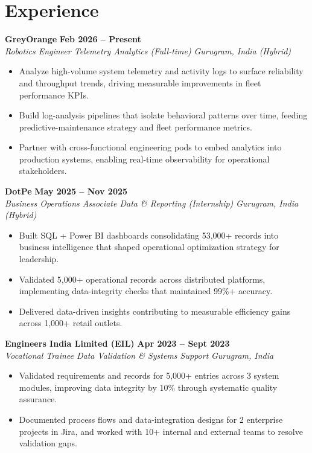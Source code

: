 \documentclass[10pt,a4paper]{article}
\newcommand{\entry}[4]{%
  \textbf{#1} \hfill \textbf{\small #4}\\
  \textit{\small #2} \hfill \textit{\small #3}\par\vspace{0.5pt}%
}
\newcommand{\rbullets}[1]{%
  {\small
  \begin{itemize}[leftmargin=1.1em,itemsep=0.5pt,topsep=1.5pt,parsep=0pt,partopsep=0pt,label=\textbullet]
    #1
  \end{itemize}}%
}
\begin{document}
\section{Experience}

\entry{GreyOrange}{Robotics Engineer \textemdash{} Telemetry Analytics (Full-time)}{Gurugram, India (Hybrid)}{Feb 2026 -- Present}
\rbullets{
  \item Analyze high-volume system telemetry and activity logs to surface reliability and throughput trends, driving measurable improvements in fleet performance KPIs.
  \item Build log-analysis pipelines that isolate behavioral patterns over time, feeding predictive-maintenance strategy and fleet performance metrics.
  \item Partner with cross-functional engineering pods to embed analytics into production systems, enabling real-time observability for operational stakeholders.
}
\vspace{2pt}

\entry{DotPe}{Business Operations Associate \textemdash{} Data \& Reporting (Internship)}{Gurugram, India (Hybrid)}{May 2025 -- Nov 2025}
\rbullets{
  \item Built SQL + Power BI dashboards consolidating 53,000+ records into business intelligence that shaped operational optimization strategy for leadership.
  \item Validated 5,000+ operational records across distributed platforms, implementing data-integrity checks that maintained 99\%+ accuracy.
  \item Delivered data-driven insights contributing to measurable efficiency gains across 1,000+ retail outlets.
}
\vspace{2pt}

\entry{Engineers India Limited (EIL)}{Vocational Trainee \textemdash{} Data Validation \& Systems Support}{Gurugram, India}{Apr 2023 -- Sept 2023}
\rbullets{
  \item Validated requirements and records for 5,000+ entries across 3 system modules, improving data integrity by 10\% through systematic quality assurance.
  \item Documented process flows and data-integration designs for 2 enterprise projects in Jira, and worked with 10+ internal and external teams to resolve validation gaps.
}
\end{document}
